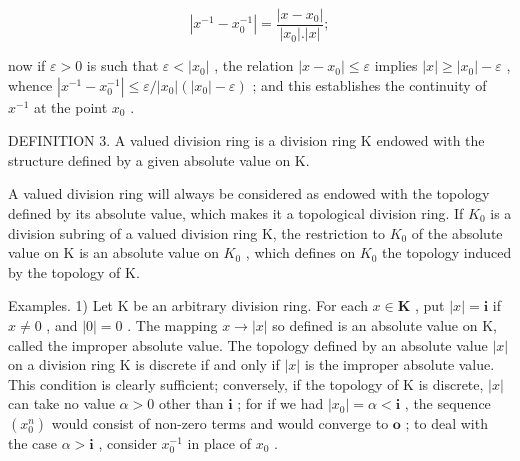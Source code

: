 \[
\left| x ^ {- 1} - x _ {0} ^ {- 1} \right| = \frac {\left| x - x _ {0} \right|}{\left| x _ {0} \right| . \left| x \right|};
\]

now if \(\varepsilon > 0\) is such that \(\varepsilon < |x_0|\) , the relation \(|x - x_0| \leqslant \varepsilon\) implies \(|x| \geqslant |x_0| - \varepsilon\) , whence \(|x^{-1} - x_{0}^{-1}| \leqslant \varepsilon / |x_0| (|x_0| - \varepsilon)\) ; and this establishes the continuity of \(x^{-1}\) at the point \(x_0\) .

DEFINITION 3. A valued division ring is a division ring K endowed with the structure defined by a given absolute value on K.

A valued division ring will always be considered as endowed with the topology defined by its absolute value, which makes it a topological division ring. If \(K_{0}\) is a division subring of a valued division ring K, the restriction to \(K_{0}\) of the absolute value on K is an absolute value on \(K_{0}\) , which defines on \(K_{0}\) the topology induced by the topology of K.

Examples. 1) Let K be an arbitrary division ring. For each \(x \in \mathbf{K}\) , put \(|x| = \mathbf{i}\) if \(x \neq 0\) , and \(|0| = 0\) . The mapping \(x \to |x|\) so defined is an absolute value on K, called the improper absolute value. The topology defined by an absolute value \(|x|\) on a division ring K is discrete if and only if \(|x|\) is the improper absolute value. This condition is clearly sufficient; conversely, if the topology of K is discrete, \(|x|\) can take no value \(\alpha > 0\) other than \(\mathbf{i}\) ; for if we had \(|x_0| = \alpha < \mathbf{i}\) , the sequence \((x_0^n)\) would consist of non-zero terms and would converge to \(\mathbf{o}\) ; to deal with the case \(\alpha > \mathbf{i}\) , consider \(x_0^{-1}\) in place of \(x_0\) .

